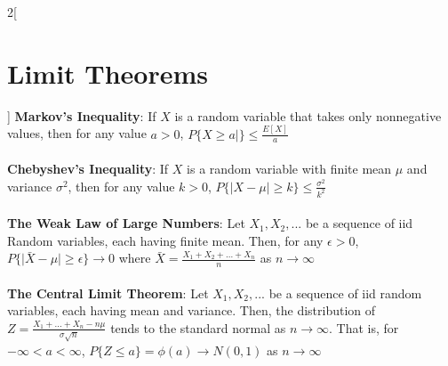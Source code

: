 \documentclass{article}
\begin{document}
	\begin{multicols}{2}[\section*{Limit Theorems}]
	\textbf{Markov's Inequality}: If $X$ is a random variable that takes only nonnegative values, then for any value $a > 0$, $P\{X \geq a|\} \leq \frac{E[X]}{a}$\\
	\\
	\textbf{Chebyshev's Inequality}: If $X$ is a random variable with finite mean $\mu$ and variance $\sigma^2$, then for any value $k > 0$, $P\{\vert X - \mu\vert \geq k\} \leq \frac{\sigma^2}{k^2}$
	\\\\
	\textbf{The Weak Law of Large Numbers}: 
	Let $X_1, X_2, ...$ be a sequence of iid Random variables, each having finite mean. Then, for any $\epsilon > 0$, $P\{\vert\bar{X} - \mu\vert \geq \epsilon\} \to 0$ where $\bar{X} = \frac{X_1 + X_2 + ... + X_n}{n}$  as $n\to\infty$\\
	\\
	\textbf{The Central Limit Theorem}:
	Let $X_1, X_2,...$ be a sequence of iid random variables, each having mean and variance. Then, the distribution of $Z = \frac{X_1 + ... + X_n - n\mu}{\sigma\sqrt{n}}$ tends to the standard normal as $n\to\infty$. That is, for $-\infty < a < \infty$, $P\{Z \leq a\} = \phi(a) \to N(0,1)$ as $n\to\infty$
	
	\end{multicols}
	
\end{document}
